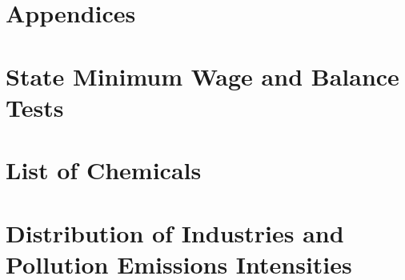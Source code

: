 \documentclass[12pt, english]{article}
\begin{document}
    \section*{Appendices}\label{sec:appendices}
    \begin{appendices}
        \renewcommand\thesection{\Roman{section}} %


        \section{State Minimum Wage and Balance Tests}\label{sec:state-minimum-wage-and-balance-tests}
        
        
        
        
        


        \section{List of Chemicals}\label{sec:list-of-chemicals}
        


        \section{Distribution of Industries and Pollution Emissions Intensities}\label{sec:distribution-of-industries-and-pollution-emissions-intensities}
        
        
        
        
        
        
        
        
        
        

    \end{appendices}
\end{document}
